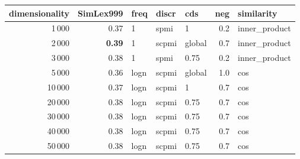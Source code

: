\begin{tabular}{rrlllrl}
\toprule
 dimensionality &  SimLex999 &  freq &  discr &     cds &  neg &     similarity \\
\midrule
           1\,000 &       0.37 &     1 &   spmi &       1 &  0.2 &  inner\_product \\
           2\,000 &       \textbf{0.39} &     1 &  scpmi &  global &  0.7 &  inner\_product \\
           3\,000 &       0.38 &     1 &   spmi &    0.75 &  0.2 &  inner\_product \\
           5\,000 &       0.36 &  logn &  scpmi &  global &  1.0 &            cos \\
          10\,000 &       0.37 &  logn &  scpmi &       1 &  0.7 &            cos \\
          20\,000 &       0.38 &  logn &  scpmi &    0.75 &  0.7 &            cos \\
          30\,000 &       0.38 &  logn &  scpmi &    0.75 &  0.7 &            cos \\
          40\,000 &       0.38 &  logn &  scpmi &    0.75 &  0.7 &            cos \\
          50\,000 &       0.38 &  logn &  scpmi &    0.75 &  0.7 &            cos \\
\bottomrule
\end{tabular}
